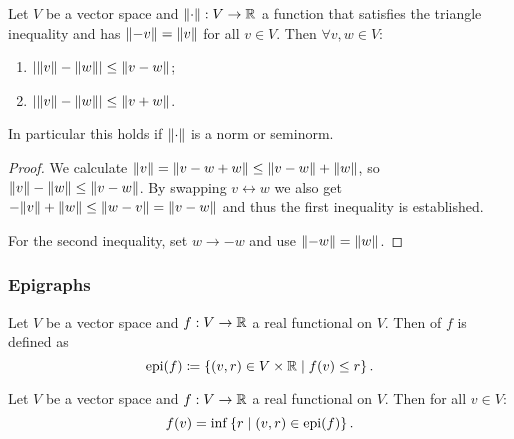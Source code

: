\begin{proposition} \label{reverseTriangleInequality}
Let $V$ be a vector space and $\lVert\cdot\rVert: V\to \mathbb{R}$ a function that satisfies the triangle inequality and has $\lVert-v\rVert = \lVert v\rVert$ for all $v\in V$. Then $\forall v,w\in V$:
\begin{enumerate}
\item $|\lVert v\rVert-\lVert w\rVert|\leq \lVert v-w\rVert$;
\item $|\lVert v\rVert-\lVert w\rVert|\leq \lVert v+w\rVert$.
\end{enumerate}
In particular this holds if $\lVert\cdot\rVert$ is a norm or seminorm.
\end{proposition}
\begin{proof}
We calculate $\lVert v\rVert = \lVert v-w+w\rVert \leq \lVert v-w\rVert + \lVert w\rVert$, so $\lVert v\rVert-\lVert w\rVert\leq \lVert v-w\rVert$. By swapping $v\leftrightarrow w$ we also get $-\lVert v\rVert+\lVert w\rVert\leq \lVert w-v\rVert = \lVert v-w\rVert$ and thus the first inequality is established.

For the second inequality, set $w\to -w$ and use $\lVert-w\rVert = \lVert w\rVert$.
\end{proof}

\subsubsection{Epigraphs}
\begin{definition}
Let $V$ be a vector space and $f: V\to \mathbb{R}$ a real functional on $V$. Then  of $f$ is defined as
\[ \operatorname{epi}(f) \coloneqq \left\{ (v,r)\in V\times \mathbb{R} \;\middle|\; f(v)\leq r \right\}. \]
\end{definition}

\begin{lemma} \label{epigraphLemma}
Let $V$ be a vector space and $f: V\to \mathbb{R}$ a real functional on $V$. Then for all $v\in V$:
\[ f(v) = \inf\left\{ r \;\middle|\; (v,r)\in \operatorname{epi}(f) \right\}. \]
\end{lemma}


